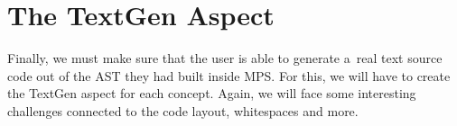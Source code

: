 \section{The TextGen Aspect}
Finally, we must make sure that the user is able to generate a~real text source code out of the AST they had built inside MPS.
For this, we will have to create the TextGen aspect for each concept.
Again, we will face some interesting challenges connected to the code layout, whitespaces and more.

